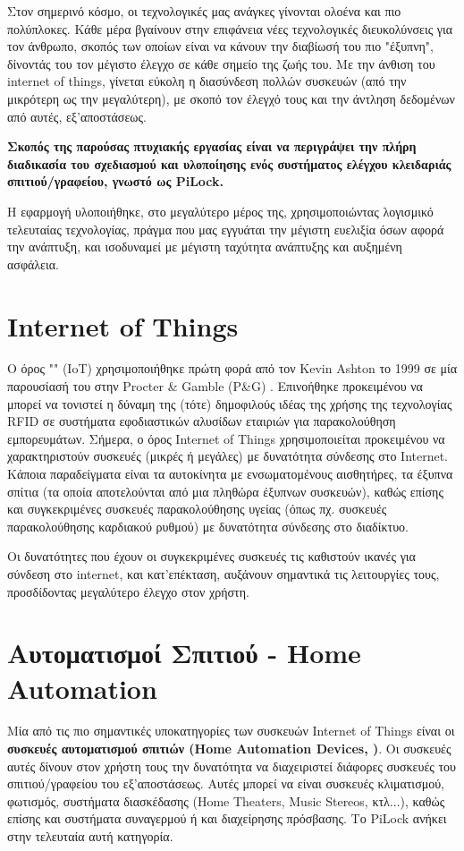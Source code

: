 Στον σημερινό κόσμο, οι τεχνολογικές μας ανάγκες γίνονται ολοένα και πιο πολύπλοκες. Κάθε μέρα βγαίνουν στην επιφάνεια νέες τεχνολογικές διευκολύνσεις για τον άνθρωπο, σκοπός των οποίων είναι να κάνουν την διαβίωσή του πιο "έξυπνη", δίνοντάς του τον μέγιστο έλεγχο σε κάθε σημείο της ζωής του. Με την άνθιση του internet of things, γίνεται εύκολη η διασύνδεση πολλών συσκευών (από την μικρότερη ως την μεγαλύτερη), με σκοπό τον έλεγχό τους και την άντληση δεδομένων από αυτές, εξ'αποστάσεως.

\textbf{Σκοπός της παρούσας πτυχιακής εργασίας είναι να περιγράψει την πλήρη διαδικασία του σχεδιασμού και υλοποίησης ενός συστήματος ελέγχου κλειδαριάς σπιτιού/γραφείου, γνωστό ως PiLock.}

Η εφαρμογή υλοποιήθηκε, στο μεγαλύτερο μέρος της, χρησιμοποιώντας λογισμικό τελευταίας τεχνολογίας, πράγμα που μας εγγυάται την μέγιστη ευελιξία όσων αφορά την ανάπτυξη, και ισοδυναμεί με μέγιστη ταχύτητα ανάπτυξης και αυξημένη ασφάλεια. %

\section{Internet of Things}
	Ο όρος "" (IoT) χρησιμοποιήθηκε πρώτη φορά από τον Kevin Ashton το 1999 σε μία παρουσίασή του στην Procter \& Gamble (P\&G) . Επινοήθηκε προκειμένου να μπορεί να τονιστεί η δύναμη της (τότε) δημοφιλούς ιδέας της χρήσης της τεχνολογίας RFID σε συστήματα εφοδιαστικών αλυσίδων εταιριών για παρακολούθηση εμπορευμάτων. Σήμερα, ο όρος Internet of Things χρησιμοποιείται προκειμένου να χαρακτηριστούν συσκευές (μικρές ή μεγάλες) με δυνατότητα σύνδεσης στο Internet. Κάποια παραδείγματα είναι τα αυτοκίνητα με ενσωματομένους αισθητήρες, τα έξυπνα σπίτια (τα οποία αποτελούνται από μια πληθώρα έξυπνων συσκευών), καθώς επίσης και συγκεκριμένες συσκευές παρακολούθησης υγείας (όπως πχ. συσκευές παρακολούθησης καρδιακού ρυθμού) με δυνατότητα σύνδεσης στο διαδίκτυο.

	Οι δυνατότητες που έχουν οι συγκεκριμένες συσκευές τις καθιστούν ικανές για σύνδεση στο internet, και κατ'επέκταση, αυξάνουν σημαντικά τις λειτουργίες τους, προσδίδοντας μεγαλύτερο έλεγχο στον χρήστη. %

\section{Αυτοματισμοί Σπιτιού - Home Automation}
	Μία από τις πιο σημαντικές υποκατηγορίες των συσκευών Internet of Things είναι οι \textbf{συσκευές αυτοματισμού σπιτιών (Home Automation Devices,   )}. Οι συσκευές αυτές δίνουν στον χρήστη τους την δυνατότητα να διαχειριστεί διάφορες συσκευές του σπιτιού/γραφείου του εξ'αποστάσεως. Αυτές μπορεί να είναι συσκευές κλιματισμού, φωτισμός, συστήματα διασκέδασης (Home Theaters, Music Stereos, κτλ...), καθώς επίσης και συστήματα συναγερμού ή και διαχείρησης πρόσβασης. Το PiLock ανήκει στην τελευταία αυτή κατηγορία.

